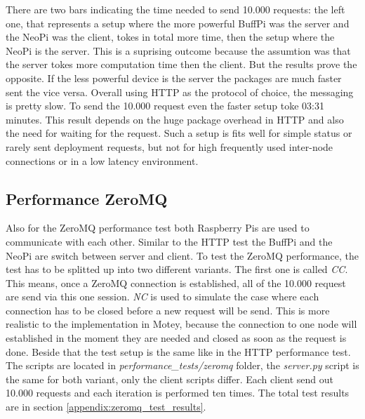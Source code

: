 There are two bars indicating the time needed to send 10.000 requests: the left one, that represents a setup where the more powerful BuffPi was the server and the NeoPi was the client, tokes in total more time, then the setup where the NeoPi is the server.
This is a suprising outcome because the assumtion was that the server tokes more computation time then the client.
But the results prove the opposite.
If the less powerful device is the server the packages are much faster sent the vice versa.
Overall using \ac{HTTP} as the protocol of choice, the messaging is pretty slow.
To send the 10.000 request even the faster setup toke 03:31 minutes.
This result depends on the huge package overhead in \ac{HTTP} and also the need for waiting for the request.
Such a setup is fits well for simple status or rarely sent deployment requests, but not for high frequently used inter-node connections or in a low latency environment.

\subsection{Performance ZeroMQ}
Also for the ZeroMQ performance test both Raspberry Pis are used to communicate with each other.
Similar to the \ac{HTTP} test the BuffPi and the NeoPi are switch between server and client.
To test the ZeroMQ performance, the test has to be splitted up into two different variants.
The first one is called \textit{\ac{CC}}.
This means, once a ZeroMQ connection is established, all of the 10.000 request are send via this one session.
\textit{\ac{NC}} is used to simulate the case where each connection has to be closed before a new request will be send.
This is more realistic to the implementation in Motey, because the connection to one node will established in the moment they are needed and closed as soon as the request is done.
Beside that the test setup is the same like in the \ac{HTTP} performance test.
The scripts are located in \textit{performance\_tests/zeromq} folder, the \textit{server.py} script is the same for both variant, only the client scripts differ.
Each client send out 10.000 requests and each iteration is performed ten times.
The total test results are in section \ref{appendix:zeromq_test_results}.

